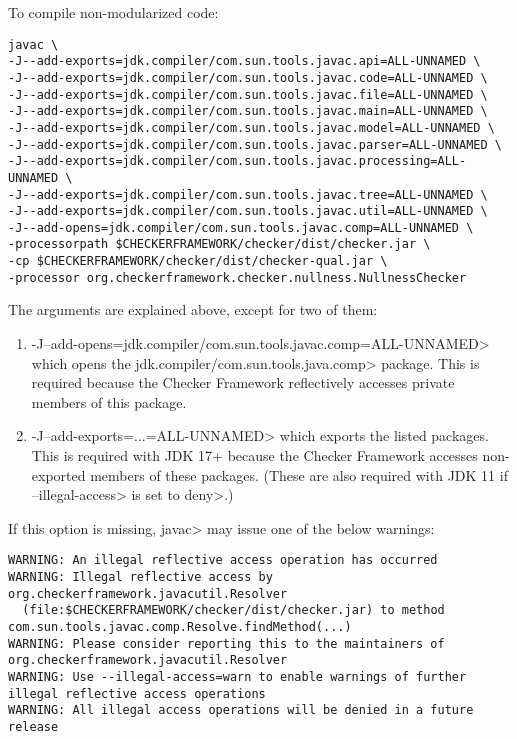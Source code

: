 
To compile non-modularized code:

\begin{Verbatim}
javac \
-J--add-exports=jdk.compiler/com.sun.tools.javac.api=ALL-UNNAMED \
-J--add-exports=jdk.compiler/com.sun.tools.javac.code=ALL-UNNAMED \
-J--add-exports=jdk.compiler/com.sun.tools.javac.file=ALL-UNNAMED \
-J--add-exports=jdk.compiler/com.sun.tools.javac.main=ALL-UNNAMED \
-J--add-exports=jdk.compiler/com.sun.tools.javac.model=ALL-UNNAMED \
-J--add-exports=jdk.compiler/com.sun.tools.javac.parser=ALL-UNNAMED \
-J--add-exports=jdk.compiler/com.sun.tools.javac.processing=ALL-UNNAMED \
-J--add-exports=jdk.compiler/com.sun.tools.javac.tree=ALL-UNNAMED \
-J--add-exports=jdk.compiler/com.sun.tools.javac.util=ALL-UNNAMED \
-J--add-opens=jdk.compiler/com.sun.tools.javac.comp=ALL-UNNAMED \
-processorpath $CHECKERFRAMEWORK/checker/dist/checker.jar \
-cp $CHECKERFRAMEWORK/checker/dist/checker-qual.jar \
-processor org.checkerframework.checker.nullness.NullnessChecker
\end{Verbatim}

The arguments are explained above, except for two of them:
\begin{enumerate}

\item \<-J--add-opens=jdk.compiler/com.sun.tools.javac.comp=ALL-UNNAMED> which
opens the \<jdk.compiler/com.sun.tools.java.comp> package.  This is
required because the Checker Framework reflectively accesses private members of this package.

\item \<-J--add-exports=...=ALL-UNNAMED> which exports the listed packages.  This is
required with JDK 17+ because the Checker Framework accesses non-exported members of these packages.
(These are also required with JDK 11 if \<--illegal-access> is set to \<deny>.)

\end{enumerate}

If this option is missing, \<javac> may issue one of the below warnings:
\begin{Verbatim}
WARNING: An illegal reflective access operation has occurred
WARNING: Illegal reflective access by org.checkerframework.javacutil.Resolver
  (file:$CHECKERFRAMEWORK/checker/dist/checker.jar) to method com.sun.tools.javac.comp.Resolve.findMethod(...)
WARNING: Please consider reporting this to the maintainers of org.checkerframework.javacutil.Resolver
WARNING: Use --illegal-access=warn to enable warnings of further illegal reflective access operations
WARNING: All illegal access operations will be denied in a future release
\end{Verbatim}

